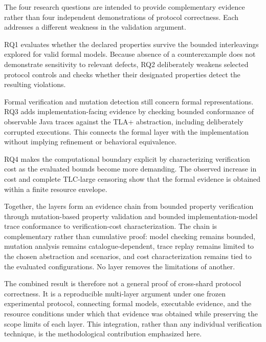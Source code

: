 The four research questions are intended to provide complementary evidence
rather than four independent demonstrations of protocol correctness. Each
addresses a different weakness in the validation argument.

RQ1 evaluates whether the declared properties survive the bounded
interleavings explored for valid formal models. Because absence of a
counterexample does not demonstrate sensitivity to relevant defects, RQ2
deliberately weakens selected protocol controls and checks whether their
designated properties detect the resulting violations.

Formal verification and mutation detection still concern formal
representations. RQ3 adds implementation-facing evidence by checking bounded
conformance of observable Java traces against the TLA+ abstraction, including
deliberately corrupted executions. This connects the formal layer with the
implementation without implying refinement or behavioral equivalence.

RQ4 makes the computational boundary explicit by characterizing verification
cost as the evaluated bounds become more demanding. The observed increase in
cost and complete TLC-large censoring show that the formal evidence is obtained
within a finite resource envelope.

Together, the layers form an evidence chain from bounded property verification
through mutation-based property validation and bounded implementation-model
trace conformance to verification-cost characterization. The chain is
complementary rather than cumulative proof: model checking remains bounded,
mutation analysis remains catalogue-dependent, trace replay remains limited to
the chosen abstraction and scenarios, and cost characterization remains tied to
the evaluated configurations. No layer removes the limitations of another.

The combined result is therefore not a general proof of cross-shard protocol
correctness. It is a reproducible multi-layer argument under one frozen
experimental protocol, connecting formal models, executable evidence, and the
resource conditions under which that evidence was obtained while preserving the
scope limits of each layer. This integration, rather than any individual
verification technique, is the methodological contribution emphasized here.
